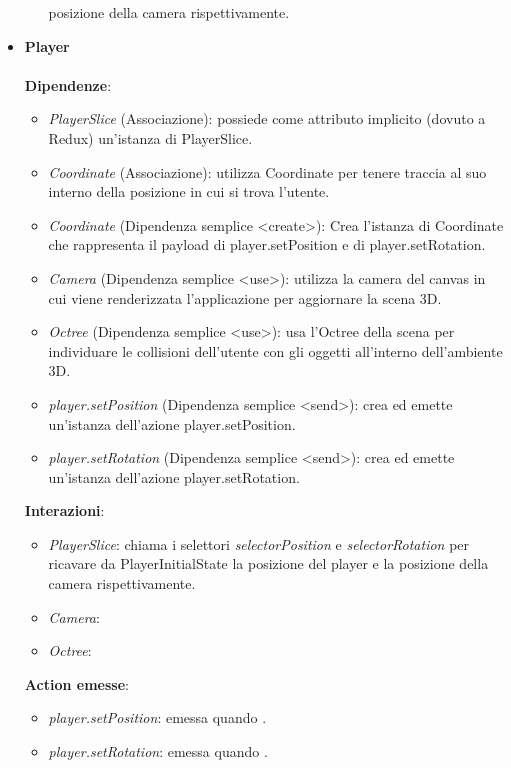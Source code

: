 \begin{itemize}
\begin{itemize}
			posizione della camera rispettivamente.
		\end{itemize}
		\item \textbf{Player}
		\\\\
		\textbf{Dipendenze}:
		\begin{itemize}
			\item \textit{PlayerSlice} (Associazione): possiede come attributo implicito (dovuto a Redux) un'istanza di PlayerSlice.
			\item \textit{Coordinate} (Associazione): utilizza Coordinate per tenere traccia al suo interno della posizione in cui si trova l'utente.
			\item \textit{Coordinate} (Dipendenza semplice \textless create\textgreater): Crea l'istanza di Coordinate che rappresenta il payload di player.setPosition
			e di player.setRotation.
			\item \textit{Camera} (Dipendenza semplice \textless use\textgreater): utilizza la camera del canvas in cui viene renderizzata l'applicazione
			 per aggiornare la scena 3D.
			\item \textit{Octree} (Dipendenza semplice \textless use\textgreater): usa l'Octree della scena per individuare le collisioni dell'utente con 
			gli oggetti all'interno dell'ambiente 3D.
			\item \textit{player.setPosition} (Dipendenza semplice \textless send\textgreater): crea ed emette un'istanza dell'azione player.setPosition.
			\item \textit{player.setRotation} (Dipendenza semplice \textless send\textgreater): crea ed emette un'istanza dell'azione player.setRotation.
		\end{itemize}
		\textbf{Interazioni}:
		\begin{itemize}
			\item \textit{PlayerSlice}: chiama i selettori \textit{selectorPosition} e \textit{selectorRotation} per ricavare da PlayerInitialState la
			posizione del player e la posizione della camera rispettivamente.
			\item \textit{Camera}: 
			\item \textit{Octree}: 
		\end{itemize}
		\textbf{Action emesse}:
		\begin{itemize}
			\item \textit{player.setPosition}: emessa quando .
			\item \textit{player.setRotation}: emessa quando .
		\end{itemize}
\end{itemize}

